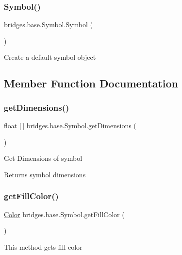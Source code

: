 \subsubsection{\texorpdfstring{Symbol()}{Symbol()}}
{\footnotesize\ttfamily bridges.\+base.\+Symbol.\+Symbol (\begin{DoxyParamCaption}{ }\end{DoxyParamCaption})}

Create a default symbol object 

\subsection{Member Function Documentation}
\mbox{\label{classbridges_1_1base_1_1_symbol_a6cf741f603dd6347325e95a2b4d13d2e}} 
\subsubsection{\texorpdfstring{getDimensions()}{getDimensions()}}
{\footnotesize\ttfamily float \mbox{[}$\,$\mbox{]} bridges.\+base.\+Symbol.\+get\+Dimensions (\begin{DoxyParamCaption}{ }\end{DoxyParamCaption})}

Get Dimensions of symbol \begin{DoxyReturn}{Returns}
symbol dimensions 
\end{DoxyReturn}
\mbox{\label{classbridges_1_1base_1_1_symbol_aed2e531266c8a3bc563709c6486380cc}} 
\subsubsection{\texorpdfstring{getFillColor()}{getFillColor()}}
{\footnotesize\ttfamily \mbox{\hyperlink{classbridges_1_1base_1_1_color}{Color}} bridges.\+base.\+Symbol.\+get\+Fill\+Color (\begin{DoxyParamCaption}{ }\end{DoxyParamCaption})}

This method gets fill color

